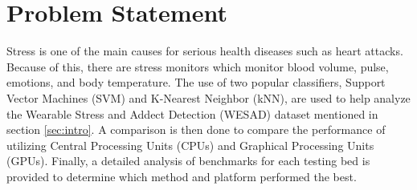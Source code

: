 \section{Problem Statement}
\label{sec:Problem-Statement}

Stress is one of the main causes for serious health diseases such as heart attacks. 
Because of this, there are stress monitors which monitor blood volume, pulse, emotions, and 
body temperature. The use of two popular classifiers, Support Vector Machines (SVM) and K-Nearest Neighbor (kNN), 
are used to help analyze the Wearable Stress and Addect Detection (WESAD) dataset mentioned in section \ref{sec:intro}. 
A comparison is then done to compare the performance of utilizing Central Processing Units (CPUs) and 
Graphical Processing Units (GPUs). Finally, a detailed analysis of benchmarks for each testing bed is 
provided to determine which method and platform performed the best. 
